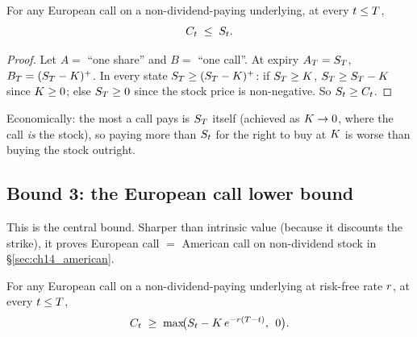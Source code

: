 \begin{proposition}
\label{prop:call_upper}
For any European call on a non-dividend-paying underlying, at
every $t \leq T$,
\begin{equation*}
  C_t \;\leq\; S_t.
\end{equation*}
\end{proposition}

\begin{proof}
Let $A =$ ``one share'' and $B =$ ``one call''. At expiry
$A_T = S_T$, $B_T = (S_T - K)^+$. In every state
$S_T \geq (S_T - K)^+$: if $S_T \geq K$,
$S_T \geq S_T - K$ since $K \geq 0$; else
$S_T \geq 0$ since the stock price is non-negative. So
$S_t \geq C_t$.
\end{proof}

Economically: the most a call pays is $S_T$ itself (achieved
as $K \to 0$, where the call \emph{is} the stock), so
paying more than $S_t$ for the right to buy at $K$ is
worse than buying the stock outright.

\subsection{Bound 3: the European call lower bound}
\label{sec:ch14_bound3}

This is the central bound. Sharper than intrinsic value (because
it discounts the strike), it proves European call $=$ American
call on non-dividend stock in \S\ref{sec:ch14_american}.

\begin{theorem}
\label{thm:call_lower_bound}
For any European call on a non-dividend-paying underlying at
risk-free rate $r$, at every $t \leq T$,
\begin{equation}
  C_t \;\geq\; \max\!\bigl(S_t - K\,e^{-r(T - t)},\;\, 0\bigr).
  \label{eq:call_lower_bound}
\end{equation}
\end{theorem}

